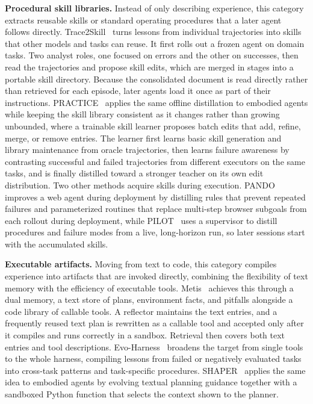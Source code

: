 \noindent\textbf{Procedural skill libraries.} Instead of only describing experience, this category extracts reusable skills or standard operating procedures that a later agent follows directly. Trace2Skill~\cite{ni2026trace2skill} turns lessons from individual trajectories into skills that other models and tasks can reuse. It first rolls out a frozen agent on domain tasks. Two analyst roles, one focused on errors and the other on successes, then read the trajectories and propose skill edits, which are merged in stages into a portable skill directory. Because the consolidated document is read directly rather than retrieved for each episode, later agents load it once as part of their instructions. PRACTICE~\cite{bai2026practice} applies the same offline distillation to embodied agents while keeping the skill library consistent as it changes rather than growing unbounded, where a trainable skill learner proposes batch edits that add, refine, merge, or remove entries. The learner first learns basic skill generation and library maintenance from oracle trajectories, then learns failure awareness by contrasting successful and failed trajectories from different executors on the same tasks, and is finally distilled toward a stronger teacher on its own edit distribution. Two other methods acquire skills during execution. PANDO~\cite{li2026pando} improves a web agent during deployment by distilling rules that prevent repeated failures and parameterized routines that replace multi-step browser subgoals from each rollout during deployment, while PILOT~\cite{xiao2026pilot} uses a supervisor to distill procedures and failure modes from a live, long-horizon run, so later sessions start with the accumulated skills.

\noindent\textbf{Executable artifacts.} Moving from text to code, this category compiles experience into artifacts that are invoked directly, combining the flexibility of text memory with the efficiency of executable tools. Metis~\cite{dai2026metis} achieves this through a dual memory, a text store of plans, environment facts, and pitfalls alongside a code library of callable tools. A reflector maintains the text entries, and a frequently reused text plan is rewritten as a callable tool and accepted only after it compiles and runs correctly in a sandbox. Retrieval then covers both text entries and tool descriptions. Evo-Harness~\cite{wei2026evo} broadens the target from single tools to the whole harness, compiling lessons from failed or negatively evaluated tasks into cross-task patterns and task-specific procedures. SHAPER~\cite{wang2026shaper} applies the same idea to embodied agents by evolving textual planning guidance together with a sandboxed Python function that selects the context shown to the planner.

